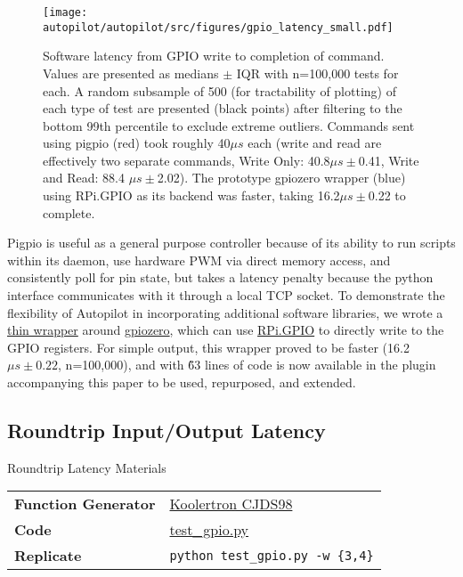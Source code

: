 \begin{figure}[hb!]
\caption{Software latency from GPIO write to completion of command. Values are presented as medians $\pm$ IQR with n=100,000 tests for each. A random subsample of 500 (for tractability of plotting) of each type of test are presented (black points) after filtering to the bottom 99th percentile to exclude extreme outliers.  Commands sent using pigpio (red) took roughly 40$\mu s$ each (write and read are effectively two separate commands, Write Only: 40.8$\mu s \pm$0.41, Write and Read: 88.4 $\mu s \pm$2.02). The prototype gpiozero wrapper (blue) using RPi.GPIO as its backend was faster, taking 16.2$\mu s \pm$0.22 to complete.}
\label{fig:gpiolags}
\texttt{[image: autopilot/autopilot/src/figures/gpio\_latency\_small.pdf]}
\end{figure}

Pigpio is useful as a general purpose controller because of its ability to run scripts within its daemon, use hardware PWM via direct memory access, and consistently poll for pin state, but takes a latency penalty because the python interface communicates with it through a local TCP socket. To demonstrate the flexibility of Autopilot in incorporating additional software libraries, we wrote a \href{https://github.com/auto-pi-lot/plugin-paper/blob/main/plugin_tests/hardware/zero.py}{thin wrapper} around \href{https://gpiozero.readthedocs.io/en/stable/}{gpiozero}, which can use \href{https://pypi.org/project/RPi.GPIO/}{RPi.GPIO} to directly write to the GPIO registers. For simple output, this wrapper proved to be faster (16.2 $\mu s \pm 0.22$, n=100,000), and with \~63 lines of code is now available in the plugin accompanying this paper to be used, repurposed, and extended.

\subsection{Roundtrip Input/Output Latency}

\begin{margintable}[2cm]
\caption{Roundtrip Latency Materials}
\label{tab:roundtrip}
\noindent\begin{tabularx}{\linewidth}{lX}%
\toprule
\textbf{Function Generator} & \href{https://wiki.auto-pi-lot.com/index.php/Koolertron\_CJDS98}{Koolertron CJDS98} \\
\textbf{Code} & \href{https://github.com/auto-pi-lot/plugin-paper/blob/main/plugin_paper/scripts/test\_gpio.py}{test\_gpio.py} \\
\textbf{Replicate} & \texttt{python test\_gpio.py -w \{3,4\}} \\
\bottomrule
\end{tabularx}
\end{margintable}


